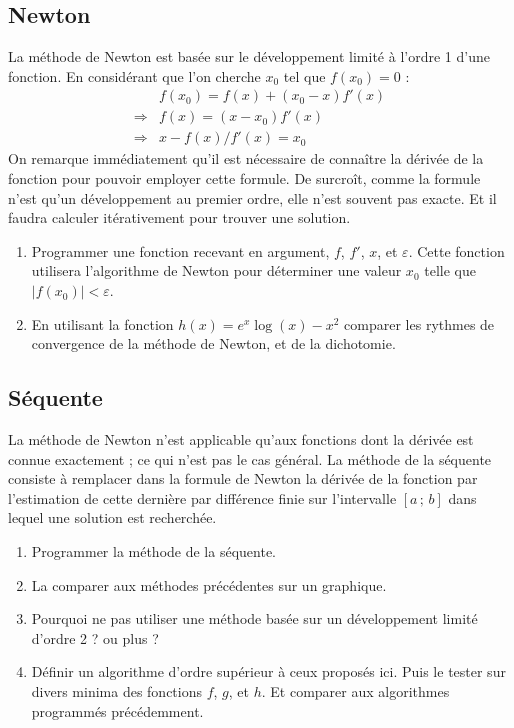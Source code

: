 \subsection{Newton}
La méthode de Newton est basée sur le développement limité à l'ordre 1 
d'une fonction. En considérant que l'on cherche $x_0$ tel que $f(x_0) = 0$ :
\begin{align}
& f(x_0) = f(x) + (x_0-x) f'(x) \\
\Rightarrow & f(x) = (x-x_0)f'(x) \\
\Rightarrow & x-f(x)/f'(x) = x_0
\end{align}
On remarque immédiatement qu'il est nécessaire de connaître la dérivée 
de la fonction pour pouvoir employer cette formule. De surcroît,
comme la formule n'est qu'un développement au premier ordre, elle n'est souvent pas
exacte. Et il faudra calculer itérativement pour trouver une solution. 
\begin{enumerate}
\item Programmer une fonction recevant en argument, $f$, $f'$, $x$, et $\varepsilon$. Cette fonction utilisera l'algorithme de Newton pour 
déterminer une valeur $x_0$ telle que $|f(x_0)| < \varepsilon$.
\item En utilisant la fonction $h(x) = e^x\log(x)-x^2$ comparer les rythmes de convergence de la méthode de Newton, et de la dichotomie. 
\end{enumerate}


\subsection{Séquente}
La méthode de Newton n'est applicable qu'aux fonctions dont la dérivée 
est connue exactement ; ce qui n'est pas le cas général. 
La méthode de la séquente consiste à remplacer dans la formule de Newton 
la dérivée de la fonction par l'estimation de cette dernière par différence finie
sur l'intervalle $[a\,;\,b]$ dans lequel une solution est recherchée. 
\begin{enumerate}
\item Programmer la méthode de la séquente.
\item La comparer aux méthodes précédentes sur un graphique.
\item Pourquoi ne pas utiliser une méthode basée sur un développement 
limité d'ordre 2 ? ou plus ? 
\item Définir un algorithme d'ordre supérieur à ceux proposés ici. 
Puis le tester sur divers minima des fonctions $f$, $g$, et $h$. Et comparer 
aux algorithmes programmés précédemment. 
\end{enumerate}


